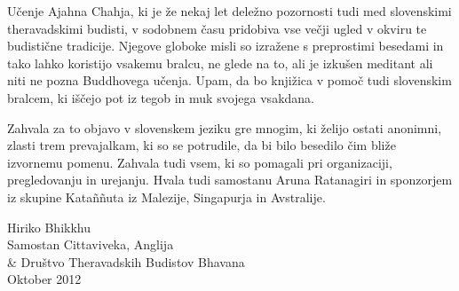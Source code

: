 
Učenje Ajahna Chahja, ki je že nekaj let deležno pozornosti tudi med slovenskimi theravadskimi budisti, v sodobnem času pridobiva vse večji ugled v okviru te budistične tradicije. Njegove globoke misli so izražene s preprostimi besedami in tako lahko koristijo vsakemu bralcu, ne glede na to, ali je izkušen meditant ali niti ne pozna Buddhovega učenja. Upam, da bo knjižica v pomoč tudi slovenskim bralcem, ki iščejo pot iz tegob in muk svojega vsakdana.

Zahvala za to objavo v slovenskem jeziku gre mnogim, ki želijo ostati anonimni, zlasti trem prevajalkam, ki so se potrudile, da bi bilo besedilo čim bliže izvornemu pomenu. Zahvala tudi vsem, ki so pomagali pri organizaciji, pregledovanju in urejanju. Hvala tudi samostanu Aruna Ratanagiri in sponzorjem iz skupine Kataññuta iz Malezije, Singapurja in Avstralije.

\vfill

{\par\raggedleft
Hiriko Bhikkhu\\
Samostan Cittaviveka, Anglija\\
\& Društvo Theravadskih Budistov Bhavana\\
Oktober 2012
\par}
